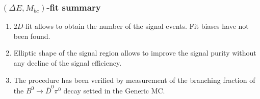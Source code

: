 \documentclass[10 pt,compress,mathserif]{beamer}
\newcommand{\bdpi}{\ensuremath{B^0\to \bar D^0\pi^0}\xspace}
\begin{document}
%  
%  

\begin{frame}
 \frametitle{$(\Delta E,M_{bc})$-fit summary}
 \begin{enumerate}
  \item $2D$-fit allows to obtain the number of the signal events. Fit biases have not been found.
  \item Elliptic shape of the signal region allows to improve the signal purity without any decline of the signal efficiency.
  \item The procedure has been verified by measurement of the branching fraction of the \bdpi decay setted in the Generic MC.
 \end{enumerate}
\end{frame}
\end{document}
